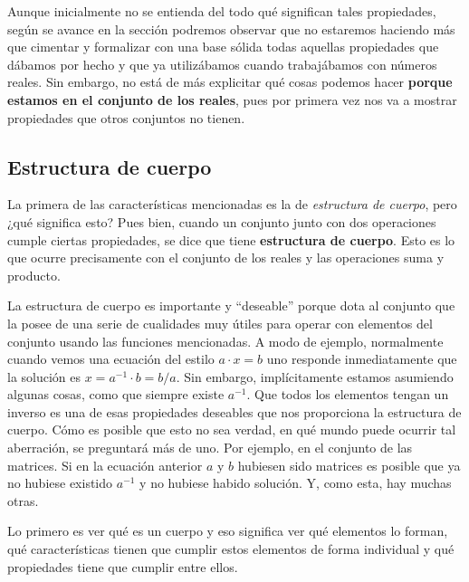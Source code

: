 \documentclass[10pt,a4paper,openright]{book}
\theoremstyle{break}
\begin{document}
Aunque inicialmente no se entienda del todo qué significan tales propiedades, según se avance en la sección podremos observar que no estaremos haciendo más que cimentar y formalizar con una base sólida todas aquellas propiedades que dábamos por hecho y que ya utilizábamos cuando trabajábamos con números reales. Sin embargo, no está de más explicitar qué cosas podemos hacer \textbf{porque estamos en el conjunto de los reales}, pues por primera vez nos va a mostrar propiedades que otros conjuntos no tienen.

\subsection{Estructura de cuerpo}
La primera de las características mencionadas es la de \textit{estructura de cuerpo}, pero ¿qué significa esto? Pues bien, cuando un conjunto junto con dos operaciones cumple ciertas propiedades, se dice que tiene \textbf{estructura de cuerpo}. Esto es lo que ocurre precisamente con el conjunto de los reales y las operaciones suma y producto.

La estructura de cuerpo es importante y ``deseable'' porque dota al conjunto que la posee de una serie de cualidades muy útiles para operar con elementos del conjunto usando las funciones mencionadas. A modo de ejemplo, normalmente cuando vemos una ecuación del estilo $a\cdot x = b$ uno responde inmediatamente que la solución es $x = a^{-1}\cdot b = b/a$. Sin embargo, implícitamente estamos asumiendo algunas cosas, como que siempre existe $a^{-1}$. Que todos los elementos tengan un inverso es una de esas propiedades deseables que nos proporciona la estructura de cuerpo. Cómo es posible que esto no sea verdad, en qué mundo puede ocurrir tal aberración, se preguntará más de uno. Por ejemplo, en el conjunto de las matrices. Si en la ecuación anterior $a$ y $b$ hubiesen sido matrices es posible que ya no hubiese existido $a^{-1}$ y no hubiese habido solución. Y, como esta, hay muchas otras.

Lo primero es ver qué es un cuerpo y eso significa ver qué elementos lo forman, qué características tienen que cumplir estos elementos de forma individual y qué propiedades tiene que cumplir entre ellos.
\end{document}
